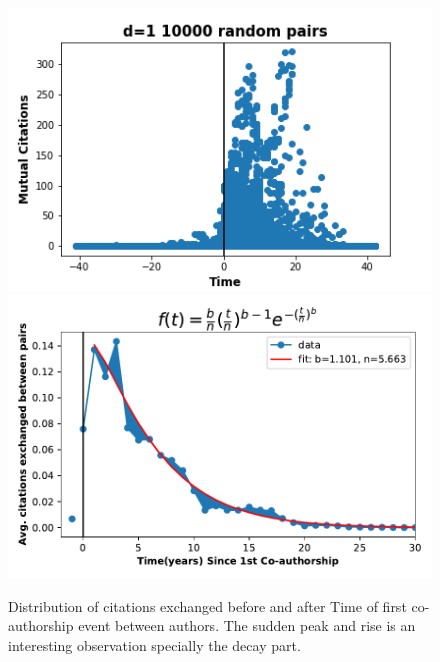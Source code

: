 \documentclass[aps, pre, twocolumn, nofootinbib]{revtex4-1}
\begin{document}
\begin{figure}[htbp]  
	\centering
	
	\includegraphics[scale = 0.49]{plots/d1}
	\includegraphics[scale = 0.49]{plots/aging_in_colab}
		
\captionsetup{singlelinecheck=false, justification=raggedright,  labelsep=space}
\caption{Distribution of citations exchanged before and after Time of first co-authorship event between authors. The sudden peak and rise is an interesting observation specially the decay part.}
   \label{f5}
\end{figure}
\end{document}
